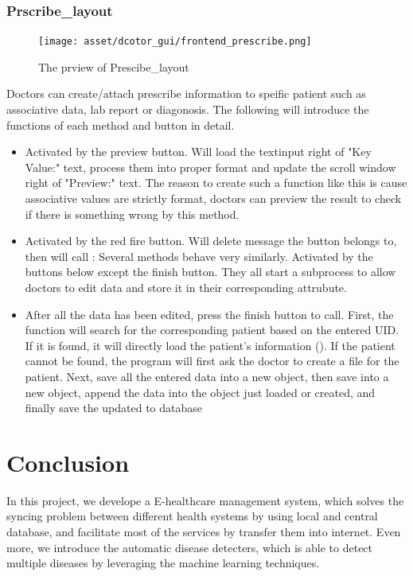 \documentclass{article}
\begin{document}
\subsubsection*{Prscribe_layout}
\begin{figure}[h]
  \centering
  \texttt{[image: asset/dcotor\_gui/frontend\_prescribe.png]}
  \caption{The prview of Prescibe_layout}
  \label{fig:frontend_prescribe}
\end{figure}

Doctors can create/attach prescribe information to speific patient such as associative data, lab report or diagonosis. The following will introduce the functions of each method and button in detail.

\begin{itemize}
  \item {} Activated by the preview button. Will load the textinput right of "Key Value:" text, process them into proper format and update the scroll window right of "Preview:" text. The reason to create such a function like this is cause associative values are strictly format, doctors can preview the result to check if there is something wrong by this method.
  \item {} Activated by the red fire button. Will delete message the button belongs to, then will call : Several methods behave very similarly. Activated by the buttons below except the finish button. They all start a subprocess to allow doctors to edit data and store it in their corresponding attrubute.
  \item {} After all the data has been edited, press the finish button to call. First, the function will search for the corresponding patient based on the entered UID. If it is found, it will directly load the patient's information (). If the patient cannot be found, the program will first ask the doctor to create a file for the patient. Next, save all the entered data into a new  object, then save  into a new  object, append the data into the  object just loaded or created, and finally save the updated  to database
\end{itemize}

\section{Conclusion}
\label{sec:conclusion}
In this project, we develope a E-healthcare management system, which solves 
the syncing problem between different health systems by using local and 
central database, and facilitate most of the services by transfer them into 
internet. Even more, we introduce the automatic disease detecters, which 
is able to detect multiple diseases by leveraging the machine learning 
techniques. 
\end{document}
